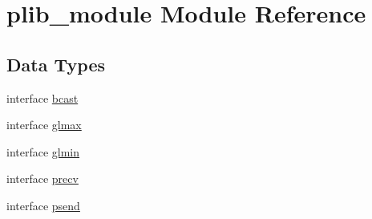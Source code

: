 \hypertarget{classplib__module}{\section{plib\-\_\-module Module Reference}
\label{classplib__module}
}
\subsection*{Data Types}
\begin{DoxyCompactItemize}
\item 
interface \hyperlink{interfaceplib__module_1_1bcast}{bcast}
\item 
interface \hyperlink{interfaceplib__module_1_1glmax}{glmax}
\item 
interface \hyperlink{interfaceplib__module_1_1glmin}{glmin}
\item 
interface \hyperlink{interfaceplib__module_1_1precv}{precv}
\item 
interface \hyperlink{interfaceplib__module_1_1psend}{psend}
\end{DoxyCompactItemize}
